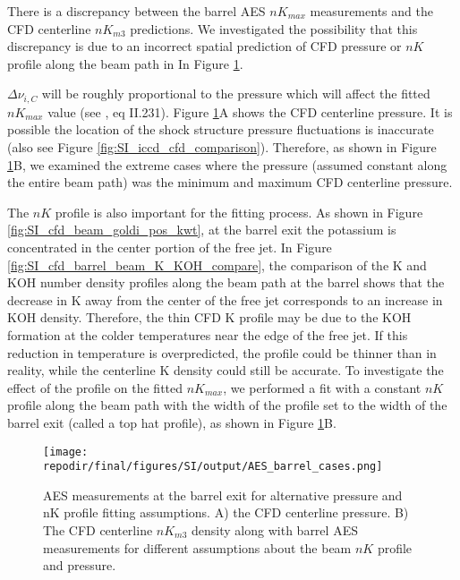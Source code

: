 There is a discrepancy between the barrel AES $nK_{max}$ measurements and the CFD centerline $nK_{m3}$ predictions. We investigated the possibility that this discrepancy is due to an incorrect spatial prediction of CFD pressure or $nK$ profile along the beam path in In Figure \ref{fig:SI_AES_barrel_cases}.  

$\Delta \nu_{i,C}$ will be roughly proportional to the pressure which will affect the fitted $nK_{max}$ value (see \cite{alkemadeMetalVapoursFlames1982}, eq II.231). Figure \ref{fig:SI_AES_barrel_cases}A shows the CFD centerline pressure. It is possible the location of the shock structure pressure fluctuations is inaccurate (also see Figure \ref{fig:SI_iccd_cfd_comparison}). Therefore, as shown in Figure \ref{fig:SI_AES_barrel_cases}B, we examined the extreme cases where the pressure (assumed constant along the entire beam path) was the minimum and maximum CFD centerline pressure. 

The $nK$ profile is also important for the fitting process. As shown in Figure \ref{fig:SI_cfd_beam_goldi_pos_kwt}, at the barrel exit the potassium is concentrated in the center portion of the free jet. In Figure \ref{fig:SI_cfd_barrel_beam_K_KOH_compare}, the comparison of the K and KOH number density profiles along the beam path at the barrel shows that the decrease in K away from the center of the free jet corresponds to an increase in KOH density. Therefore, the thin CFD K profile may be due to the KOH formation at the colder temperatures near the edge of the free jet. If this reduction in temperature is overpredicted, the profile could be thinner than in reality, while the centerline K density could still be accurate. To investigate the effect of the profile on the fitted $nK_{max}$, we performed a fit with a constant $nK$ profile along the beam path with the width of the profile set to the width of the barrel exit (called a top hat profile), as shown in Figure \ref{fig:SI_AES_barrel_cases}B.


\begin{figure}[]
    \centering
    \texttt{[image: \\repodir/final/figures/SI/output/AES\_barrel\_cases.png]}
    \caption{AES measurements at the barrel exit for alternative pressure and nK profile fitting assumptions. A) the CFD centerline pressure. B) The CFD centerline $nK_{m3}$ density along with barrel AES measurements for different assumptions about the beam $nK$ profile and pressure. }
    \label{fig:SI_AES_barrel_cases}
\end{figure}


